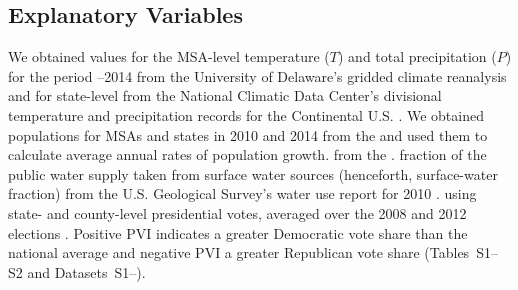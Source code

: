 \documentclass[draft,linenumbers]{agujournal}
\begin{document}
\subsection{Explanatory Variables}
We obtained values for the MSA-level
temperature ($T$) and  total precipitation ($P$) for the period
--2014
%
from the University of Delaware's gridded climate reanalysis
\citep{matsuura:gridded.temp:2015,matsuura:gridded.precip:2015}
and for state-level from the National Climatic Data Center's divisional
temperature and precipitation records for the Continental U.S.
\citep{vose:nclimdiv:2014}.
%
We obtained populations for MSAs and states in 2010 and 2014
from the \citet{census:population:2015} and used them to calculate average
annual rates of population growth.
%
%
from the \citet{bea:rpi:2016}.
fraction of the public water supply taken from surface water sources
(henceforth, surface-water fraction) from the U.S. Geological
Survey's water use report for 2010 \citep{maupin:water.use:2014}.
%
using state- and county-level presidential votes, averaged over the 2008 and 2012
elections \citep{cook:pvi:2013,cq:elections:2016}.
Positive PVI indicates a greater Democratic vote share than the national average
and negative PVI a greater Republican vote share
(Tables~S1--S2 and Datasets~S1--).
\end{document}
